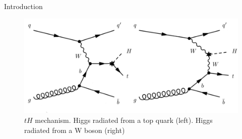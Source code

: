 \begin{chapter}{Introduction}
\begin{figure}[ht]
	\centering
	\includegraphics[scale=0.5]{Chapter1/newtHq.png}
	\caption[$tH$ mechanism]{$tH$ mechanism. Higgs radiated from a top quark (left). Higgs radiated from a W boson (right) \protect \cite{bb}} \label{newth}
\end{figure}
\pagebreak
\end{chapter}













